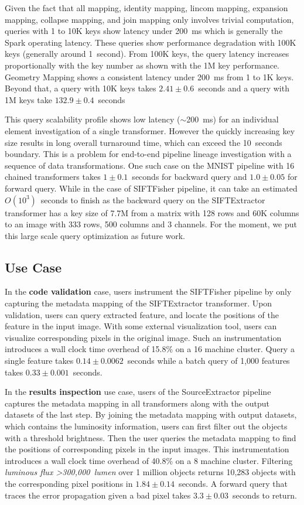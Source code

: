 \documentclass{sig-alternate}
\begin{document}
Given the fact that all mapping, identity mapping, lincom mapping, expansion mapping, collapse mapping, and join mapping
only involves trivial computation, queries with 1 to 10K keys show latency under 200~ms which is generally the Spark operating latency. 
These queries show performance degradation with 100K keys (generally around 1~second). 
From 100K keys, the query latency increases proportionally with the key number as shown with the 1M key performance.
Geometry Mapping shows a consistent latency under 200~ms from 1 to 1K keys. 
Beyond that, a query with 10K keys takes $2.41\pm0.6$~seconds and a query with 1M keys take $132.9\pm0.4$~seconds

This query scalability profile shows low latency ($\sim$200~ms) for an individual element investigation of a single transformer. 
However the quickly increasing key size results in long overall turnaround time, which can exceed the 10~seconds boundary. 
This is a problem for end-to-end pipeline lineage investigation with a sequence of data transformations.
One such case on the MNIST pipeline with 16 chained transformers takes $1\pm0.1$~seconds for backward query and $1.0\pm0.05$ for forward query.
While in the case of SIFTFisher pipeline,  it can take an estimated $O(10^3)$~seconds to finish as the backward query on the SIFTExtractor
transformer has a key size of 7.7M from a matrix with 128 rows and 60K columns to an image with 333 rows, 500 columns and 3 channels. 
For the moment, we put this large scale query optimization as future work.

\subsection{Use Case}
In the {\bf code validation} case, users instrument the SIFTFisher pipeline by only capturing the metadata mapping of the SIFTExtractor transformer.
Upon validation, users can query extracted feature, and locate the positions of the feature in the input image. With some external visualization tool,
users can visualize corresponding pixels in the original image. Such an instrumentation introduces a wall clock time overhead of 15.8\% on a 16 machine 
cluster.
Query a single feature takes $0.14\pm0.0062$~seconds while a batch query of 1,000 features takes $0.33\pm0.001$~seconds.

In the {\bf results inspection} use case, users of the SourceExtractor pipeline captures the metadata mapping in all transformers along with the output 
datasets of the last step. By joining the metadata mapping with output datasets, which contains the luminosity information, users can first filter out the
objects with a threshold brightness. Then the user queries the metadata mapping to find the positions of corresponding pixels in the input images.
This instrumentation introduces a wall clock time overhead of 40.8\% on a 8 machine cluster. 
Filtering {\it luminous flux >300,000~lumen} over 1 million objects returns 10,283 objects
with the corresponding pixel positions in $1.84\pm0.14$~seconds. 
A forward query that traces the error propagation given a bad pixel takes $3.3\pm0.03$~seconds to return.
\end{document}
